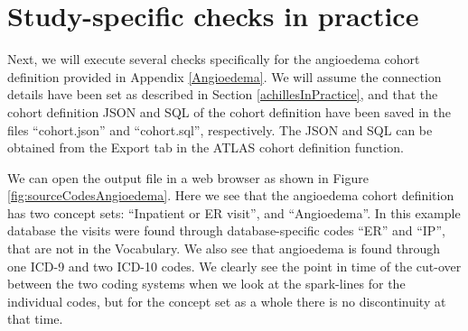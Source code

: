 \documentclass[11pt]{book}
\newenvironment{Shaded}{\begin{snugshade}}{\end{snugshade}}
\newcommand{\DataTypeTok}[1]{\textcolor[rgb]{0.13,0.29,0.53}{#1}}
\newcommand{\KeywordTok}[1]{\textcolor[rgb]{0.13,0.29,0.53}{\textbf{#1}}}
\newcommand{\NormalTok}[1]{#1}
\newcommand{\OperatorTok}[1]{\textcolor[rgb]{0.81,0.36,0.00}{\textbf{#1}}}
\newcommand{\StringTok}[1]{\textcolor[rgb]{0.31,0.60,0.02}{#1}}
\theoremstyle{definition}
\theoremstyle{definition}
\theoremstyle{definition}
\theoremstyle{remark}
\begin{document}
\hypertarget{study-specific-checks-in-practice}{%
\section{Study-specific checks in practice}\label{study-specific-checks-in-practice}}

Next, we will execute several checks specifically for the angioedema cohort definition provided in Appendix \ref{Angioedema}. We will assume the connection details have been set as described in Section \ref{achillesInPractice}, and that the cohort definition JSON and SQL of the cohort definition have been saved in the files ``cohort.json'' and ``cohort.sql'', respectively. The JSON and SQL can be obtained from the Export tab in the ATLAS cohort definition function.

\begin{Shaded}
\end{Shaded}

We can open the output file in a web browser as shown in Figure \ref{fig:sourceCodesAngioedema}. Here we see that the angioedema cohort definition has two concept sets: ``Inpatient or ER visit'', and ``Angioedema''. In this example database the visits were found through database-specific codes ``ER'' and ``IP'', that are not in the Vocabulary. We also see that angioedema is found through one ICD-9 and two ICD-10 codes. We clearly see the point in time of the cut-over between the two coding systems when we look at the spark-lines for the individual codes, but for the concept set as a whole there is no discontinuity at that time.
\end{document}
